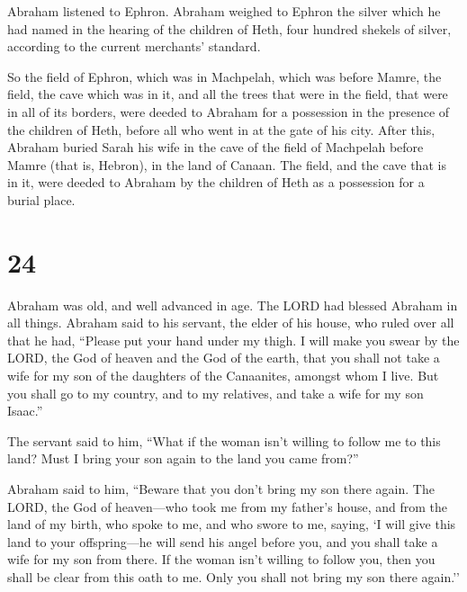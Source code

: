  Abraham listened to Ephron. Abraham weighed to Ephron the
silver which he had named in the hearing of the children of Heth, four
hundred shekels of silver, according to the current merchants' standard.

 So the field of Ephron, which was in Machpelah, which was
before Mamre, the field, the cave which was in it, and all the trees
that were in the field, that were in all of its borders, were deeded
 to Abraham for a possession in the presence of the
children of Heth, before all who went in at the gate of his city.
 After this, Abraham buried Sarah his wife in the cave of
the field of Machpelah before Mamre (that is, Hebron), in the land of
Canaan.  The field, and the cave that is in it, were deeded
to Abraham by the children of Heth as a possession for a burial place.

\hypertarget{section-23}{%
\section{24}\label{section-23}}

 Abraham was old, and well advanced in age. The LORD had
blessed Abraham in all things.  Abraham said to his servant,
the elder of his house, who ruled over all that he had, ``Please put
your hand under my thigh.  I will make you swear by the
LORD, the God of heaven and the God of the earth, that you shall not
take a wife for my son of the daughters of the Canaanites, amongst whom
I live.  But you shall go to my country, and to my
relatives, and take a wife for my son Isaac.''

 The servant said to him, ``What if the woman isn't willing
to follow me to this land? Must I bring your son again to the land you
came from?''

 Abraham said to him, ``Beware that you don't bring my son
there again.  The LORD, the God of heaven---who took me from
my father's house, and from the land of my birth, who spoke to me, and
who swore to me, saying, `I will give this land to your offspring---he
will send his angel before you, and you shall take a wife for my son
from there.  If the woman isn't willing to follow you, then
you shall be clear from this oath to me. Only you shall not bring my son
there again.''

